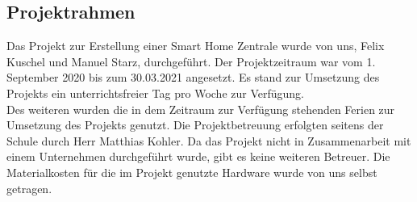 \subsection{Projektrahmen}\label{vw_projektrahmen}
Das Projekt zur Erstellung einer Smart Home Zentrale wurde von uns, Felix Kuschel und Manuel Starz, durchgeführt. 
Der Projektzeitraum war vom 1. September 2020 bis zum 30.03.2021 angesetzt. 
Es stand zur Umsetzung des Projekts ein unterrichtsfreier Tag pro Woche zur Verfügung.\\
\noindent Des weiteren wurden die in dem Zeitraum zur Verfügung stehenden Ferien zur Umsetzung des Projekts genutzt. Die Projektbetreuung erfolgten seitens der Schule durch Herr Matthias Kohler. 
Da das Projekt nicht in Zusammenarbeit mit einem Unternehmen durchgeführt wurde, gibt es keine weiteren Betreuer. 
Die Materialkosten für die im Projekt genutzte Hardware wurde von uns selbst getragen.